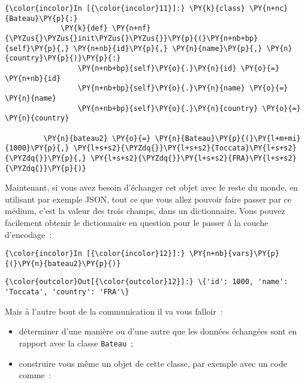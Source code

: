     \begin{Verbatim}[commandchars=\\\{\},frame=single,framerule=0.3mm,rulecolor=\color{cellframecolor}]
{\color{incolor}In [{\color{incolor}11}]:} \PY{k}{class} \PY{n+nc}{Bateau}\PY{p}{:}
             \PY{k}{def} \PY{n+nf}{\PYZus{}\PYZus{}init\PYZus{}\PYZus{}}\PY{p}{(}\PY{n+nb+bp}{self}\PY{p}{,} \PY{n+nb}{id}\PY{p}{,} \PY{n}{name}\PY{p}{,} \PY{n}{country}\PY{p}{)}\PY{p}{:}
                 \PY{n+nb+bp}{self}\PY{o}{.}\PY{n}{id} \PY{o}{=} \PY{n+nb}{id}
                 \PY{n+nb+bp}{self}\PY{o}{.}\PY{n}{name} \PY{o}{=} \PY{n}{name}
                 \PY{n+nb+bp}{self}\PY{o}{.}\PY{n}{country} \PY{o}{=} \PY{n}{country}
                 
         \PY{n}{bateau2} \PY{o}{=} \PY{n}{Bateau}\PY{p}{(}\PY{l+m+mi}{1000}\PY{p}{,} \PY{l+s+s2}{\PYZdq{}}\PY{l+s+s2}{Toccata}\PY{l+s+s2}{\PYZdq{}}\PY{p}{,} \PY{l+s+s2}{\PYZdq{}}\PY{l+s+s2}{FRA}\PY{l+s+s2}{\PYZdq{}}\PY{p}{)}
\end{Verbatim}


    Maintenant, si vous avez besoin d'échanger cet objet avec le reste du
monde, en utilisant par exemple JSON, tout ce que vous allez pouvoir
faire passer par ce médium, c'est la valeur des trois champs, dans un
dictionnaire. Vous pouvez facilement obtenir le dictionnaire en question
pour le passer à la couche d'encodage~:

    \begin{Verbatim}[commandchars=\\\{\},frame=single,framerule=0.3mm,rulecolor=\color{cellframecolor}]
{\color{incolor}In [{\color{incolor}12}]:} \PY{n+nb}{vars}\PY{p}{(}\PY{n}{bateau2}\PY{p}{)}
\end{Verbatim}


\begin{Verbatim}[commandchars=\\\{\},frame=single,framerule=0.3mm,rulecolor=\color{cellframecolor}]
{\color{outcolor}Out[{\color{outcolor}12}]:} \{'id': 1000, 'name': 'Toccata', 'country': 'FRA'\}
\end{Verbatim}
            
    Mais à l'autre bout de la communication il va vous falloir~:

\begin{itemize}
\tightlist
\item
  déterminer d'une manière ou d'une autre que les données échangées sont
  en rapport avec la classe \texttt{Bateau}~;
\item
  construire vous même un objet de cette classe, par exemple avec un
  code comme~:
\end{itemize}

